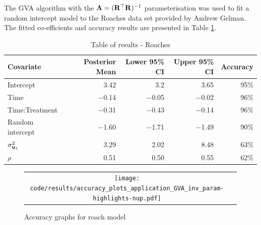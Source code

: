 			The GVA algorithm with the ${\boldsymbol \Lambda} = ({\bf R}^\top {\bf R})^{-1}$ parameterisation was used to fit a random
			intercept model to the Roaches data set provided by Andrew Gelman. The fitted co-efficients and accuracy
			results are presented in Table \ref{tab:application_roaches}.
					
					
					
			\begin{table}
				\begin{tabular}{|l|rrrr|}
					\hline
					Covariate          & Posterior Mean & Lower 95\% CI & Upper 95\% CI & Accuracy \\
					\hline
					Intercept          & 3.42						& 3.2 					& 3.65          & 95\%     \\
					Time               & $-$0.14        & $-$0.05       & $-$0.02       & 96\%     \\
					Time:Treatment     & $-$0.31        & $-$0.43       & $-$0.14       & 96\%     \\
					Random intercept   & $-$1.60        & $-$1.71       & $-$1.49       & 90\%     \\
					$\sigma^2_{{\bf u}_1}$ & 3.29           & 2.02          & 8.48          & 63\%     \\
					$\rho$             & 0.51           & 0.50          & 0.55          & 62\%     \\
					\hline
				\end{tabular}
				\caption{Table of results - Roaches}
				\label{tab:application_roaches}
			\end{table}
					
			\begin{figure}
				\centering
				\begin{tabular}{@{}c@{\hspace{.5cm}}c@{}}
				\texttt{[image: code/results/accuracy\_plots\_application\_GVA\_inv\_param-highlights-nup.pdf]}
				\end{tabular}
				\caption{Accuracy graphs for roach model}
				\label{fig:accuracy_roach}
			\end{figure}
					

